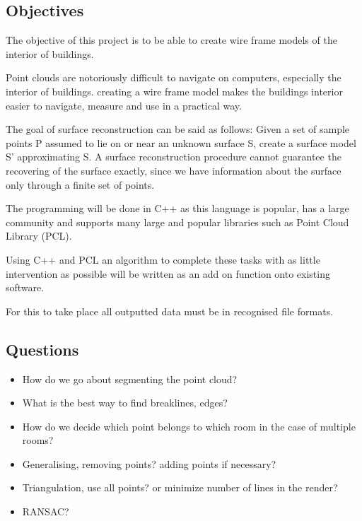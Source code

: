\subsection{Objectives}

The objective of this project is to be able to create wire frame models of the interior of buildings.

Point clouds are notoriously difficult to navigate on computers, especially the interior of buildings. creating a wire frame model makes the buildings interior easier to navigate, measure and use in a practical way.

The goal of surface reconstruction can be said as follows: Given a set of sample points P assumed to lie on or near an unknown surface S, create a surface model S' approximating S.
A surface reconstruction procedure cannot guarantee the recovering of the surface exactly, since we have information about the surface only through a finite set of points.

The programming will be done in C++ as this language is popular, has a large community and supports many large and popular libraries such as Point Cloud Library (PCL). 

Using C++ and PCL an algorithm to complete these tasks with as little intervention as possible will be written as an add on function onto existing software.

For this to take place all outputted data must be in recognised file formats.


\subsection{Questions}
\begin{itemize}
	
	\item How do we go about segmenting the point cloud?
	
	\item What is the best way to find breaklines, edges?
	
	\item How do we decide which point belongs to which room in the case of multiple rooms?
	
	\item Generalising, removing points? adding points if necessary?
	
	\item Triangulation, use all points? or minimize number of lines in the render?
	
	\item RANSAC?
	
\end{itemize}



